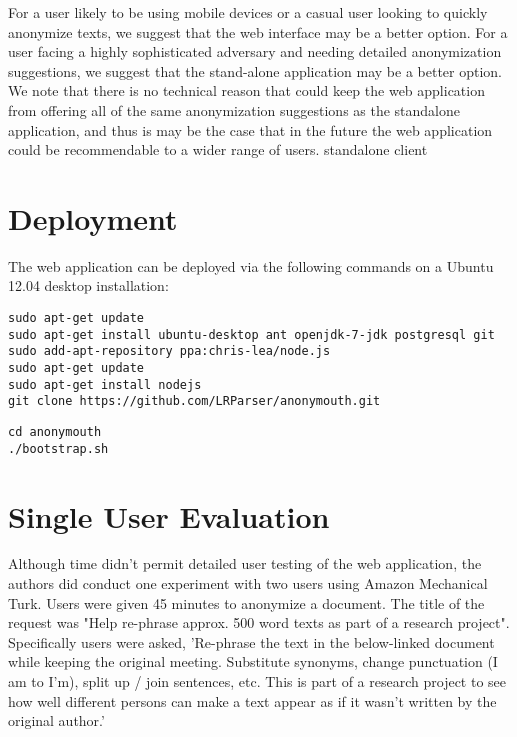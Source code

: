 \documentclass[letterpaper]{article}
\begin{document}
For a user likely to be using
mobile devices or a casual user looking to quickly anonymize texts,
we suggest that the web interface may be a better option. For a user
facing a highly sophisticated adversary and needing detailed
anonymization suggestions, we suggest that the stand-alone application
may be a better option. We note that there is no technical reason that
could keep the web application from offering all of the same
anonymization suggestions as the standalone application, and thus is
may be the case that in the future the web application could be
recommendable to a wider range of users.
standalone client

\section{Deployment}

The web application can be deployed via the following commands on a
Ubuntu 12.04 desktop installation:

\begin{lstlisting}[caption={Install Dependencies},label={lst:install}]
sudo apt-get update
sudo apt-get install ubuntu-desktop ant openjdk-7-jdk postgresql git
sudo add-apt-repository ppa:chris-lea/node.js
sudo apt-get update
sudo apt-get install nodejs
git clone https://github.com/LRParser/anonymouth.git
\end{lstlisting}

\begin{lstlisting}[caption={Start Service},label={lst:start}]
cd anonymouth
./bootstrap.sh
\end{lstlisting}

\section{Single User Evaluation}

Although time didn't permit detailed user testing of the web
application, the authors did conduct one experiment with two users
using Amazon Mechanical Turk. Users were given 45 minutes to anonymize
a document. The title of the request was "Help re-phrase approx. 500
word texts as part of a research project". Specifically users were
asked, 'Re-phrase the text in the below-linked document while keeping
the original meeting. Substitute synonyms, change punctuation (I am to
I'm), split up / join sentences, etc. This is part of a research
project to see how well different persons can make a text appear as if
it wasn't written by the original author.'
\end{document}
